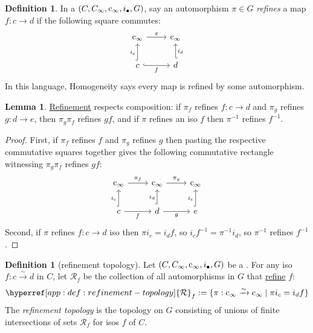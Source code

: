 \documentclass[
  sigconf,
  screen, ]{acmart}
\theoremstyle{definition}
\newtheorem{lemma}[theorem]{Lemma}
\newtheorem{definition}[theorem]{Definition}
\newcommand\calR{\mathcal R}
\newcommand\nref[2]{\hyperref[#1]{#2}} \newcommand\checkhigh{{\huge{\color{red}\textbf{TODO: check}}}}
\newcommand\cinfty{{{\rm c}_\infty}}
\begin{document}
\begin{definition} \label{app:def:nominal-refinement}
  In a 
  $(C,C_\infty, \cinfty,i_\bullet,G)$,
  say an automorphism $\pi \in G$
  \emph{refines} a map $f : c\to d$
  if the following square commutes:
    \[\begin{tikzcd}
    \cinfty \arrow[r, "\pi"]                 & \cinfty                    \\
    c \arrow[u, "i_c", hook] \arrow[r, "f"', hook] & d \arrow[u, "i_d"', hook']
    \end{tikzcd}\]
  In this language, Homogeneity says every map is refined by some automorphism.
\end{definition}

\begin{lemma} \label{app:lem:refinement-respects-comp}
  \nref{app:def:nominal-refinement}{Refinement}
  respects composition:
  if $\pi_f$ refines $f : c\to d$
  and $\pi_g$ refines $g : d\to e$,
  then $\pi_g\pi_f$ refines $gf$,
  and if $\pi$ refines an iso $f$ then $\pi^{-1}$
  refines $f^{-1}$.
\end{lemma}
\begin{proof}
  First, if $\pi_f$ refines $f$ and $\pi_g$ refines $g$
  then pasting the respective commutative squares
  together gives the following commutative rectangle witnessing
  $\pi_g\pi_f$ refines $gf$:
\[  \begin{tikzcd}
  \cinfty \arrow[r, "\pi_f"]               & \cinfty \arrow[r, "\pi_g"]               & \cinfty                  \\
  c \arrow[r, "f"'] \arrow[u, "i_c", hook] & d \arrow[u, "i_d", hook] \arrow[r, "g"'] & e \arrow[u, "i_e", hook]
  \end{tikzcd}\]
  Second, if $\pi$ refines $f : c\to d$ iso then $\pi i_c = i_d f$,
  so $i_c f^{-1} = \pi^{-1} i_d$, so $\pi^{-1}$ refines $f^{-1}$.
\end{proof}

\newcommand\refineset{{\nref{app:def:refinement-topology}{\calR}}}

\begin{definition}[refinement topology] \label{app:def:refinement-topology}
  Let $(C,C_\infty, \cinfty,i_\bullet,G)$
  be a .
  For any iso $f : c\xrightarrow\sim d$
  in $C$,
  let $\refineset_{f}$ be the
  collection of all automorphisms in $G$
  that \nref{app:def:nominal-refinement}{refine} $f$:
  \[ \refineset_f := \{ \pi : \cinfty\xrightarrow\sim\cinfty \mid \pi i_c = i_d f \} \]
  The \emph{refinement topology}
  is the topology on $G$
  consisting of unions of finite intersections of sets $\refineset_f$ for isos $f$ of $C$.
\end{definition}
\end{document}

